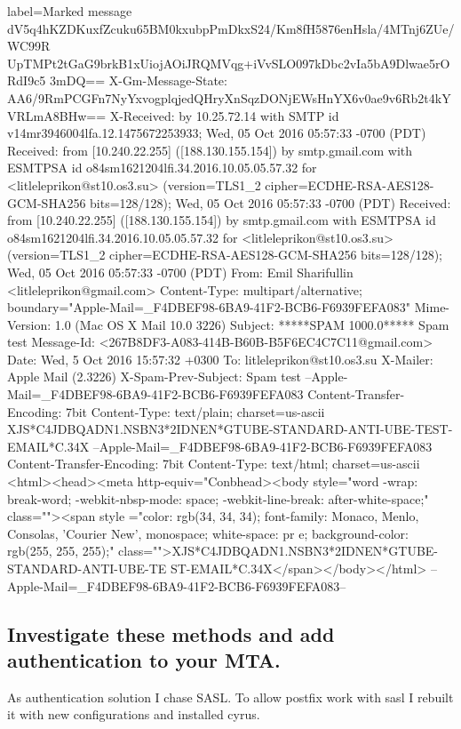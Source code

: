 \documentclass[a4paper,11pt]{article}
\begin{document}
\begin{bashcode*}{label=Marked message}
         dV5q4hKZDKuxfZcuku65BM0kxubpPmDkxS24/Km8fH5876enHsla/4MTnj6ZUe/WC99R
         UpTMPt2tGaG9brkB1xUiojAOiJRQMVqg+iVvSLO097kDbc2vIa5bA9Dlwae5rORdI9c5
         3mDQ==
X-Gm-Message-State: AA6/9RmPCGFn7NyYxvogplqjedQHryXnSqzDONjEWsHnYX6v0ae9v6Rb2t4kYVRLmA8BHw==
X-Received: by 10.25.72.14 with SMTP id v14mr3946004lfa.12.1475672253933;
        Wed, 05 Oct 2016 05:57:33 -0700 (PDT)
Received: from [10.240.22.255] ([188.130.155.154])
        by smtp.gmail.com with ESMTPSA id o84sm1621204lfi.34.2016.10.05.05.57.32
        for <litleleprikon@st10.os3.su>
        (version=TLS1_2 cipher=ECDHE-RSA-AES128-GCM-SHA256 bits=128/128);
        Wed, 05 Oct 2016 05:57:33 -0700 (PDT)
Received: from [10.240.22.255] ([188.130.155.154])
        by smtp.gmail.com with ESMTPSA id o84sm1621204lfi.34.2016.10.05.05.57.32
        for <litleleprikon@st10.os3.su>
        (version=TLS1_2 cipher=ECDHE-RSA-AES128-GCM-SHA256 bits=128/128);
        Wed, 05 Oct 2016 05:57:33 -0700 (PDT)
From: Emil Sharifullin <litleleprikon@gmail.com>
Content-Type: multipart/alternative;
 boundary="Apple-Mail=_F4DBEF98-6BA9-41F2-BCB6-F6939FEFA083"
Mime-Version: 1.0 (Mac OS X Mail 10.0 \(3226\))
Subject: *****SPAM 1000.0***** Spam test
Message-Id: <267B8DF3-A083-414B-B60B-B5F6EC4C7C11@gmail.com>
Date: Wed, 5 Oct 2016 15:57:32 +0300
To: litleleprikon@st10.os3.su
X-Mailer: Apple Mail (2.3226)
X-Spam-Prev-Subject: Spam test
--Apple-Mail=_F4DBEF98-6BA9-41F2-BCB6-F6939FEFA083
Content-Transfer-Encoding: 7bit
Content-Type: text/plain;
        charset=us-ascii
XJS*C4JDBQADN1.NSBN3*2IDNEN*GTUBE-STANDARD-ANTI-UBE-TEST-EMAIL*C.34X
--Apple-Mail=_F4DBEF98-6BA9-41F2-BCB6-F6939FEFA083
Content-Transfer-Encoding: 7bit
Content-Type: text/html;
        charset=us-ascii
<html><head><meta http-equiv="Conbhead><body style="word
-wrap: break-word; -webkit-nbsp-mode: space; -webkit-line-break: after-white-space;" class=""><span style
="color: rgb(34, 34, 34); font-family: Monaco, Menlo, Consolas, 'Courier New', monospace; white-space: pr
e; background-color: rgb(255, 255, 255);" class="">XJS*C4JDBQADN1.NSBN3*2IDNEN*GTUBE-STANDARD-ANTI-UBE-TE
ST-EMAIL*C.34X</span></body></html>
--Apple-Mail=_F4DBEF98-6BA9-41F2-BCB6-F6939FEFA083--
\end{bashcode*}

\addtocounter{subsection}{1}
\subsection{Investigate these methods and add authentication to your MTA.}
As authentication solution I chase SASL. To allow postfix work with sasl I rebuilt it with new configurations and installed cyrus.
\end{document}
